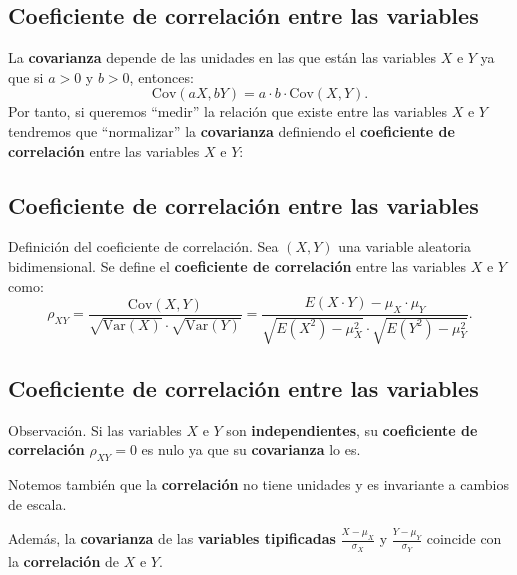 \documentclass[]{book}
\begin{document}
\hypertarget{coeficiente-de-correlaciuxf3n-entre-las-variables}{%
\subsection{Coeficiente de correlación entre las variables}\label{coeficiente-de-correlaciuxf3n-entre-las-variables}}

La \textbf{covarianza} depende de las unidades en las que están las variables \(X\) e \(Y\) ya que si \(a>0\) y \(b>0\), entonces:
\[
\mathrm{Cov}(aX,bY)=a\cdot b\cdot \mathrm{Cov}(X,Y).
\]
Por tanto, si queremos ``medir'' la relación que existe entre las variables \(X\) e \(Y\) tendremos que ``normalizar'' la \textbf{covarianza} definiendo el \textbf{coeficiente de correlación} entre las variables \(X\) e \(Y\):

\hypertarget{coeficiente-de-correlaciuxf3n-entre-las-variables-1}{%
\subsection{Coeficiente de correlación entre las variables}\label{coeficiente-de-correlaciuxf3n-entre-las-variables-1}}

Definición del coeficiente de correlación.
Sea \((X,Y)\) una variable aleatoria bidimensional. Se define el \textbf{coeficiente de correlación} entre las variables \(X\) e \(Y\) como:
\[
\rho_{XY}=\frac{\mathrm{Cov}(X,Y)}{\sqrt{\mathrm{Var}(X)}\cdot\sqrt{\mathrm{Var}(Y)}}=\frac{E(X\cdot Y)-\mu_X\cdot \mu_Y}{\sqrt{E\left(X^2\right)-\mu_X^2}\cdot \sqrt{E\left(Y^2\right)-\mu_Y^2}}.
\]

\hypertarget{coeficiente-de-correlaciuxf3n-entre-las-variables-2}{%
\subsection{Coeficiente de correlación entre las variables}\label{coeficiente-de-correlaciuxf3n-entre-las-variables-2}}

Observación.
Si las variables \(X\) e \(Y\) son \textbf{independientes}, su \textbf{coeficiente de correlación} \(\rho_{XY}=0\) es nulo ya que su \textbf{covarianza} lo es.

Notemos también que la \textbf{correlación} no tiene unidades y es invariante a cambios de escala.

Además, la \textbf{covarianza} de las \textbf{variables tipificadas} \(\frac{X-\mu_X}{\sigma_X}\) y \(\frac{Y-\mu_Y}{\sigma_Y}\) coincide con la \textbf{correlación} de \(X\) e \(Y\).
\end{document}
